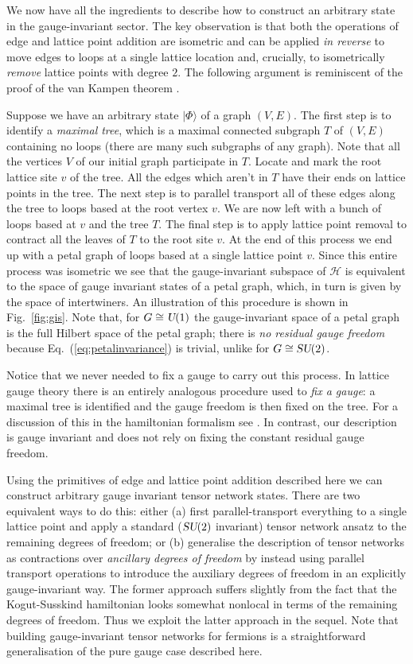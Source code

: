 \documentclass[twocolumn,lengthcheck,superscriptaddress]{revtex4-1}
\def\su2{\textsl{SU}(2)}
\def\uone{\textsl{U}(1)}
\theoremstyle{definition}
\theoremstyle{remark}
\begin{document}
We now have all the ingredients to describe how to construct an arbitrary state in the gauge-invariant sector. The key observation is that both the operations of edge and lattice point addition are isometric and can be applied \emph{in reverse} to move edges to loops at a single lattice location and, crucially, to isometrically \emph{remove} lattice points with degree $2$. The following argument is reminiscent of the proof of the van Kampen theorem \cite{hatcher:2002}.

Suppose we have an arbitrary state $|\Phi\rangle$ of a graph $(V,E)$. The first step is to identify a \emph{maximal tree}, which is a maximal connected subgraph $T$ of $(V,E)$ containing no loops (there are many such subgraphs of any graph). Note that all the vertices $V$ of our initial graph participate in $T$. Locate and mark the root lattice site $v$ of the tree. All the edges which aren't in $T$ have their ends on lattice points in the tree. The next step is to parallel transport all of these edges along the tree to loops based at the root vertex $v$. We are now left with a bunch of loops based at $v$ and the tree $T$. The final step is to apply lattice point removal to contract all the leaves of $T$ to the root site $v$. At the end of this process we end up with a petal graph of loops based at a single lattice point $v$. 
Since this entire process was isometric we see that the gauge-invariant subspace of $\mathcal{H}$ is equivalent to the space of gauge invariant states of a petal graph, which, in turn is given by the space of intertwiners. An illustration of this procedure is shown in Fig.~\ref{fig:gis}. Note that, for $G \cong \uone$ the gauge-invariant space of a petal graph is the full Hilbert space of the petal graph; there is \emph{no residual gauge freedom} because Eq.~(\ref{eq:petalinvariance}) is trivial, unlike for $G \cong \su2$.

Notice that we never needed to fix a gauge to carry out this process. In lattice gauge theory there is an entirely analogous procedure used to \emph{fix a gauge}: a maximal tree is identified and the gauge freedom is then fixed on the tree. For a discussion of this in the hamiltonian formalism see \cite{ligterink:2000a}. In contrast, our description is gauge invariant and does not rely on fixing the constant residual gauge freedom.

Using the primitives of edge and lattice point addition described here we can construct arbitrary gauge invariant tensor network states. There are two equivalent ways to do this: either (a) first parallel-transport everything to a single lattice point and apply a standard ($\su2$ invariant) tensor network ansatz to the remaining degrees of freedom; or (b) generalise the description of  tensor networks as contractions over \emph{ancillary degrees of freedom} by instead using parallel transport operations to introduce the auxiliary degrees of freedom in an explicitly gauge-invariant way. The former approach suffers slightly from the fact that the Kogut-Susskind hamiltonian looks somewhat nonlocal in terms of the remaining degrees of freedom. Thus we exploit the latter approach in the sequel. Note that building gauge-invariant tensor networks for fermions is a straightforward generalisation of the pure gauge case described here. 
\end{document}
